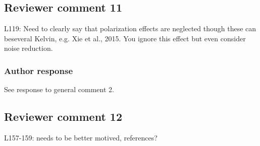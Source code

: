 \documentclass[11pt]{scrartcl}
\begin{document}
\subsection*{Reviewer comment 11}

L119: Need to clearly say that polarization effects are neglected though these can beseveral Kelvin, e.g.  Xie et al., 2015.  You ignore this effect but even consider noise reduction.


\subsubsection*{Author response}

See response to general comment 2. 



\subsection*{Reviewer comment 12}
L157-159: needs to be better motived, references?
\end{document}
